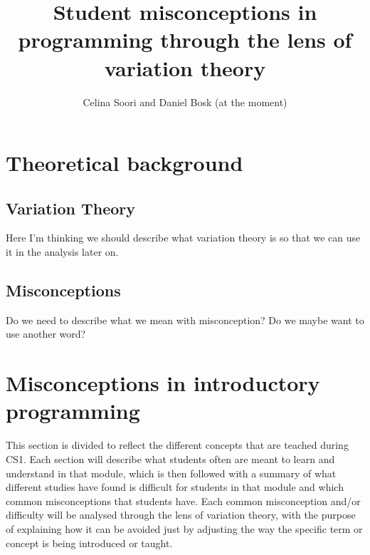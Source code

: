 \documentclass[onecolumn]{article}
\title{Student misconceptions in programming through the lens of variation 
theory}
\author{Celina Soori and Daniel Bosk (at the moment)}
\begin{document}
\maketitle
\newpage
\tableofcontents
\newpage




\section{Theoretical background}


\subsection{Variation Theory}

Here I'm thinking we should describe what variation theory is so that we can use it in the analysis later on.

\subsection{Misconceptions}

Do we need to describe what we mean with misconception? Do we maybe want to use another word? 





\section{Misconceptions in introductory programming}
\label{misconceptions}

This section is divided to reflect the different concepts that are teached during CS1. Each section will describe what students often are meant to learn and understand in that module, which is then followed with a summary of what different studies have found is difficult for students in that module and which common misconceptions that students have. Each common misconception and/or difficulty will be analysed through the lens of variation theory, with the purpose of explaining how it can be avoided just by adjusting the way the specific term or concept is being introduced or taught. 










\newpage
\printbibliography
\end{document}
